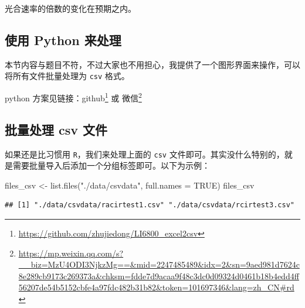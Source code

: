 \documentclass[
]{krantz}
\makeatletter
\newenvironment{Shaded}{\begin{snugshade}}{\end{snugshade}}
\newcommand{\AttributeTok}[1]{\textcolor[rgb]{0.77,0.63,0.00}{#1}}
\newcommand{\ConstantTok}[1]{\textcolor[rgb]{0.00,0.00,0.00}{#1}}
\newcommand{\ControlFlowTok}[1]{\textcolor[rgb]{0.13,0.29,0.53}{\textbf{#1}}}
\newcommand{\DecValTok}[1]{\textcolor[rgb]{0.00,0.00,0.81}{#1}}
\newcommand{\FunctionTok}[1]{\textcolor[rgb]{0.00,0.00,0.00}{#1}}
\newcommand{\NormalTok}[1]{#1}
\newcommand{\OtherTok}[1]{\textcolor[rgb]{0.56,0.35,0.01}{#1}}
\newcommand{\SpecialCharTok}[1]{\textcolor[rgb]{0.00,0.00,0.00}{#1}}
\newcommand{\StringTok}[1]{\textcolor[rgb]{0.31,0.60,0.02}{#1}}
\renewcommand{\href}[2]{#2\footnote{\url{#1}}}
\newenvironment{kframe}{%
\medskip{}
\setlength{\fboxsep}{.8em}
 \def\at@end@of@kframe{}%
 \ifinner\ifhmode%
  \def\at@end@of@kframe{\end{minipage}}%
  \begin{minipage}{\columnwidth}%
 \fi\fi%
 \def\FrameCommand##1{\hskip\@totalleftmargin \hskip-\fboxsep
 \colorbox{shadecolor}{##1}\hskip-\fboxsep
     \hskip-\linewidth \hskip-\@totalleftmargin \hskip\columnwidth}%
 \MakeFramed {\advance\hsize-\width
   \@totalleftmargin\z@ \linewidth\hsize
   \@setminipage}}%
 {\par\unskip\endMakeFramed%
 \at@end@of@kframe}
\renewenvironment{Shaded}{\begin{kframe}}{\end{kframe}}
\makeatother
\begin{document}
光合速率的倍数的变化在预期之内。

\hypertarget{python}{%
\subsection{使用 Python 来处理}\label{python}}

本节内容与题目不符，不过大家也不用担心，我提供了一个图形界面来操作，可以将所有文件批量处理为 \texttt{csv} 格式。

python 方案见链接：\href{https://github.com/zhujiedong/LI6800_excel2csv}{github} 或 \href{https://mp.weixin.qq.com/s?__biz=MzU4ODI3NjkzMg==\&mid=2247485489\&idx=2\&sn=9aed981d7624c8e289cb9173c269373a\&chksm=fdde7d9acaa9f48c3dc0d09324d0461b18b4edd4ff56207de54b5152cbfe4a97fdc482b31b82\&token=101697346\&lang=zh_CN\#rd}{微信}

\hypertarget{python-r-batch}{%
\subsection{批量处理 csv 文件}\label{python-r-batch}}

如果还是比习惯用 \texttt{R}，我们来处理上面的 \texttt{csv} 文件即可。其实没什么特别的，就是需要批量导入后添加一个分组标签即可。以下为示例：

\begin{Shaded}
\begin{Highlighting}[]
\NormalTok{files\_csv }\OtherTok{\textless{}{-}} \FunctionTok{list.files}\NormalTok{(}\StringTok{"./data/csvdata"}\NormalTok{, }\AttributeTok{full.names =} \ConstantTok{TRUE}\NormalTok{)}
\NormalTok{files\_csv}
\end{Highlighting}
\end{Shaded}

\begin{verbatim}
## [1] "./data/csvdata/racirtest1.csv" "./data/csvdata/rcirtest3.csv"
\end{verbatim}

\begin{Shaded}
\end{Shaded}
\end{document}
